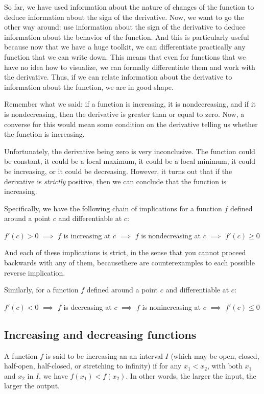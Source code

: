 \documentclass[10pt]{amsart}
\begin{document}
So far, we have used information about the nature of changes of the
function to deduce information about the sign of the derivative. Now,
we want to go the other way around: use information about the sign of
the derivative to deduce information about the behavior of the
function. And this is particularly useful because now that we have a
huge toolkit, we can differentiate practically any function that we
can write down. This means that even for functions that we have no
idea how to visualize, we can formally differentiate them and work
with the derivative. Thus, if we can relate information about the
derivative to information about the function, we are in good shape.

Remember what we said: if a function is increasing, it is
nondecreasing, and if it is nondecreasing, then the derivative is
greater than or equal to zero. Now, a converse for this would mean
some condition on the derivative telling us whether the function is
increasing.

Unfortunately, the derivative being zero is very inconclusive. The
function could be constant, it could be a local maximum, it could be a
local minimum, it could be increasing, or it could be
decreasing. However, it turns out that if the derivative is {\em
strictly} positive, then we can conclude that the function is
increasing.

Specifically, we have the following chain of implications for a
function $f$ defined around a point $c$ and differentiable at $c$:

$f'(c) > 0$ $\implies$ $f$ is increasing at $c$ $\implies$ $f$ is
nondecreasing at $c$ $\implies$ $f'(c) \ge 0$

And each of these implications is strict, in the sense that you cannot
proceed backwards with any of them, becausethere are counterexamples
to each possible reverse implication.

Similarly, for a function $f$ defined around a point $c$ and
differentiable at $c$: 

$f'(c) < 0$ $\implies$ $f$ is decreasing at $c$ $\implies$ $f$ is
nonincreasing at $c$ $\implies$ $f'(c) \le 0$

\subsection{Increasing and decreasing functions}

A function $f$ is said to be increasing an an interval $I$ (which may
be open, closed, half-open, half-closed, or stretching to infinity) if
for any $x_1 < x_2$, with both $x_1$ and $x_2$ in $I$, we have $f(x_1)
< f(x_2)$. In other words, the larger the input, the larger the output.
\end{document}
